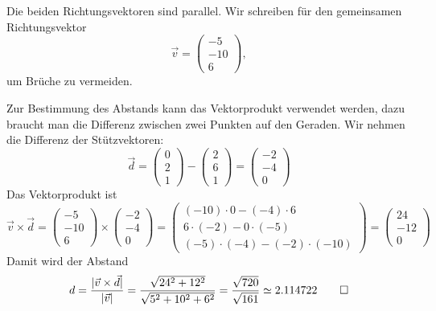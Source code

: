 \begin{loesung}
Die beiden Richtungsvektoren sind parallel.
Wir schreiben für den gemeinsamen Richtungsvektor
\[
\vec v=
\begin{pmatrix}-5\\-10\\6\end{pmatrix},
\]
um Brüche zu vermeiden.

Zur Bestimmung des
Abstands kann das Vektorprodukt verwendet werden, dazu braucht man
die Differenz zwischen zwei Punkten auf den Geraden. Wir nehmen die 
Differenz der Stützvektoren:
\[
\vec d=
\begin{pmatrix}0\\2\\1\end{pmatrix}
-\begin{pmatrix}2\\6\\1\end{pmatrix}
=
\begin{pmatrix}-2\\-4\\0\end{pmatrix}
\]
Das Vektorprodukt ist
\[
\vec v\times \vec d
=
\begin{pmatrix}-5\\-10\\6\end{pmatrix}
\times
\begin{pmatrix}-2\\-4\\0\end{pmatrix}
=
\begin{pmatrix}
(-10)\cdot 0 - (-4) \cdot 6 \\
6\cdot (-2) - 0 \cdot (-5)\\ 
(-5)\cdot (-4) - (-2) \cdot (-10)
\end{pmatrix}
=
\begin{pmatrix}24\\-12\\0\end{pmatrix}
\]
Damit wird der Abstand
\begin{align*}
d
=
\frac{|\vec v\times \vec d|}{|\vec v|}
=\frac{\sqrt{24^2+12^2}}{\sqrt{5^2+10^2+6^2}}
=\frac{\sqrt{720}}{\sqrt{161}}
\simeq 2.114722
\qedhere
\end{align*}
\end{loesung}

